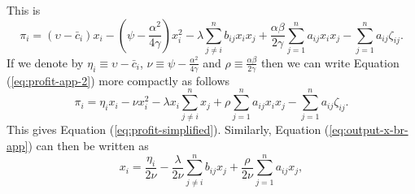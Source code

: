 This is
\begin{equation}
\pi_i = (\upsilon- \bar{c}_i)  x_i - (\psi - \frac{\alpha^2}{4 \gamma}) x_i^2 - \lambda \sum_{j \ne i}^n b_{ij} x_i x_j   +
 \frac{\alpha \beta}{2 \gamma}   \sum_{j=1}^n a_{ij} x_i x_j  - \sum_{j=1}^n a_{ij}\zeta_{ij}.
\label{eq:profit-app-2}
\end{equation}
If we denote by $\eta_i \equiv \upsilon - \bar{c}_i$, $\nu \equiv \psi-\frac{\alpha^2}{4\gamma}$ and $\rho \equiv \frac{\alpha \beta}{2 \gamma}$ then we can write Equation (\ref{eq:profit-app-2}) more compactly as follows
\begin{equation}
\pi_i = \eta_i x_i - \nu x_i^2 - \lambda x_i \sum_{j \ne i}^n x_j + \rho
\sum_{j=1}^n a_{ij} x_i x_j - \sum_{j=1}^n a_{ij}\zeta_{ij}.
\label{eq:profit-pi-app-3}
\end{equation}
This gives Equation (\ref{eq:profit-simplified}). Similarly, Equation (\ref{eq:output-x-br-app}) can then be written as
\begin{equation}
x_i = \frac{\eta_i}{2 \nu} - \frac{\lambda}{2 \nu} \sum_{j \ne i}^n b_{ij} x_j +
\frac{\rho}{2 \nu} \sum_{j=1}^n a_{ij} x_j,
\label{eq:output-br-app}
\end{equation}
